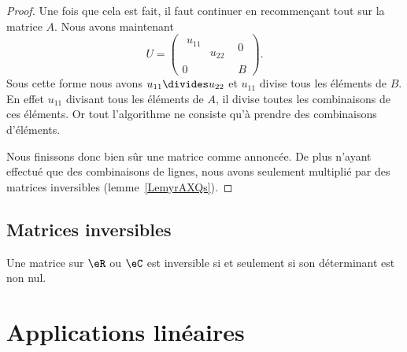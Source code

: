 \begin{proof}
    Une fois que cela est fait, il faut continuer en recommençant tout sur la matrice \( A\). Nous avons maintenant
    \begin{equation}
        U=\begin{pmatrix}
            \begin{matrix}
                u_{11}  &       \\
                &   u_{22}
            \end{matrix}&   0    \\
            0    &   B
        \end{pmatrix}.
    \end{equation}
    Sous cette forme nous avons \( u_{11}\divides u_{22}\) et \( u_{11}\) divise tous les éléments de \( B\). En effet \( u_{11}\) divisant tous les éléments de \( A\), il divise toutes les combinaisons de ces éléments. Or tout l'algorithme ne consiste qu'à prendre des combinaisons d'éléments.

    Nous finissons donc bien sûr une matrice comme annoncée. De plus n'ayant effectué que des combinaisons de lignes, nous avons seulement multiplié par des matrices inversibles (lemme~\ref{LemyrAXQs}).
\end{proof}

\subsection{Matrices inversibles}

\begin{theorem}     \label{THOooSNXWooSRjleb}
    Une matrice sur \( \eR\) ou \( \eC\) est inversible si et seulement si son déterminant est non nul.
\end{theorem}

\section{Applications linéaires}

